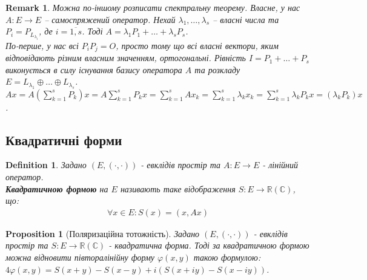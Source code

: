 \documentclass[a4paper, 10pt]{article}
\theoremstyle{theoremdd}
\newtheorem{definition}[theorem]{Definition}
\newtheorem{proposition}[theorem]{Proposition}
\newtheorem{remark}[theorem]{Remark}
\begin{document}
\begin{remark}
Можна по-іншому розписати спектральну теорему. Власне, у нас $A \colon E \to E$ -- самоспряжений оператор. Нехай $\lambda_1,\dots,\lambda_s$ -- власні числа та $P_i = P_{L_{\lambda_i}}$, де $i = \overline{1,s}$. Тоді $A = \lambda_1 P_1 + \dots + \lambda_s P_s$.
\bigskip \\
По-перше, у нас всі $P_iP_j = O$, просто тому що всі власні вектори, яким відповідають різним власним значенням, ортогональні. Рівність $I = P_1 + \dots + P_s$ виконується в силу існування базису оператора $A$ та розкладу $E = L_{\lambda_1} \oplus \dots \oplus L_{\lambda_s}$.\\
$Ax = A \displaystyle\left( \sum_{k=1}^s P_k \right) x = A \sum_{k=1}^s P_k x = \sum_{k=1}^s A x_k = \sum_{k=1}^s \lambda_k x_k = \sum_{k=1}^s \lambda_k P_k x = \left( \lambda_k P_k \right) x$.
\end{remark}

\iffalse
\subsection{Квадратичні форми}
\begin{definition}
Задано $(E,(\cdot,\cdot))$ - евклідів простір та $A: E \to E$ - лінійний оператор.\\
\textbf{Квадратичною формою} на $E$ називають таке відображення $S: E \to \mathbb{R} (\mathbb{C})$, що:
\begin{align*}
\forall x \in E: S(x) = (x,Ax)
\end{align*}
\end{definition}

\begin{proposition}[Поляризаційна тотожність]
Задано $(E,(\cdot,\cdot))$ - евклідів простір та $S: E \to \mathbb{R}(\mathbb{C})$ - квадратична форма. Тоді за квадратичною формою можна відновити півторалінійну форму $\varphi(x,y)$ такою формулою:\\
$4 \varphi(x,y) = S(x+y) - S(x-y) + i(S(x+iy)-S(x-iy))$.
\iffalse
В дійсному випадку $2\varphi(x,y) - 2\varphi(y,x) = S(x+y)- S(x-y)$.
\fi
\end{proposition}
\end{document}
